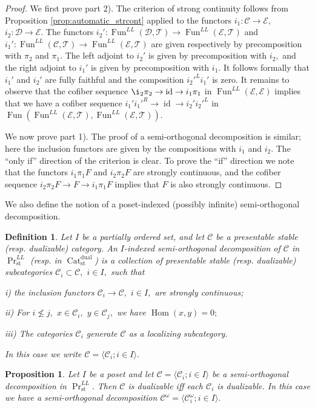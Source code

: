 \documentclass[11pt,leqno]{amsart}
\newtheorem{defi}[theo]{Definition}
\newtheorem{prop}[theo]{Proposition}
\numberwithin{equation}{section}
\def\Hom{\operatorname{Hom}}
\newcommand{\Cat}{\operatorname{Cat}}
\newcommand{\st}{\operatorname{st}}
\newcommand{\dual}{\operatorname{dual}}
\newcommand{\cD}{{\mathcal D}}
\newcommand{\cC}{{\mathcal C}}
\newcommand{\cE}{{\mathcal E}}
\newcommand{\cT}{{\mathcal T}}
\newcommand{\la}{\langle}
\newcommand{\ra}{\rangle}
\newcommand{\Fun}{\operatorname{Fun}}
\newcommand{\id}{\operatorname{id}}
\begin{document}
\begin{proof} We first prove part 2). The criterion of strong continuity follows from Proposition \ref{prop:automatic_strcont} applied to the functors $i_1:\cC\to\cE,$ $i_2:\cD\to\cE.$ 
The functors $i_2':\Fun^{LL}(\cD,\cT)\to \Fun^{LL}(\cE,\cT)$ and $i_1':\Fun^{LL}(\cC,\cT)\to \Fun^{LL}(\cE,\cT)$ are given respectively by precomposition with $\pi_2$ and $\pi_1.$ The left adjoint to $i_2'$ is given by precomposition with $i_2,$ and the right adjoint to $i_1'$ is given by precomposition with $i_1.$ It follows formally that $i_1'$ and $i_2'$ are fully faithful and the composition $i_2'^L i_1'$ is zero. It remains to observe that the cofiber sequence $\i_2\pi_2\to\id\to i_1\pi_1$ in $\Fun^{LL}(\cE,\cE)$ implies that we have a cofiber sequence $i_1' i_1'^R\to\id\to i_2'i_2'^L$ in $\Fun(\Fun^{LL}(\cE,\cT),\Fun^{LL}(\cE,\cT)).$

We now prove part 1). The proof of a semi-orthogonal decomposition is similar; here the inclusion functors are given by the compositions with $i_1$ and $i_2.$ The ``only if'' direction of the criterion is clear. To prove the ``if'' direction we note that the functors $i_1\pi_1 F$ and $i_2\pi_2 F$ are strongly continuous, and the cofiber sequence $i_2\pi_2 F\to F\to i_1\pi_1 F$ implies that $F$ is also strongly continuous.
\end{proof}

We also define the notion of a poset-indexed (possibly infinite) semi-orthogonal decomposition.

\begin{defi}\label{defi:infinite_SOD}Let $I$ be a partially ordered set, and let $\cC$ be a presentable stable (resp. dualizable) category. An $I$-indexed semi-orthogonal decomposition of $\cC$ in $\Pr^{LL}_{\st}$ (resp. in $\Cat_{\st}^{\dual}$) is a collection of presentable stable (resp. dualizable) subcategories $\cC_i\subset\cC,$ $i\in I,$ such that

i) the inclusion functors $\cC_i\to\cC,$ $i\in I,$ are strongly continuous;

ii) For $i\not\leq j,$ $x\in \cC_i,$ $y\in\cC_j,$ we have $\Hom(x,y)=0;$

iii) The categories $\cC_i$ generate $\cC$ as a localizing subcategory.

In this case we write $\cC=\la \cC_i; i\in I\ra.$\end{defi}

\begin{prop}\label{prop:infinite_SOD_of_dualizable} Let $I$ be a poset and let $\cC=\la \cC_i; i\in I\ra$ be a semi-orthogonal decomposition in $\Pr_{\st}^{LL}.$ Then $\cC$ is dualizable iff each $\cC_i$ is dualizable. In this case we have a semi-orthogonal decomposition $\cC^{\omega}=\la \cC_i^{\omega}; i\in I\ra.$\end{prop}
\end{document}
